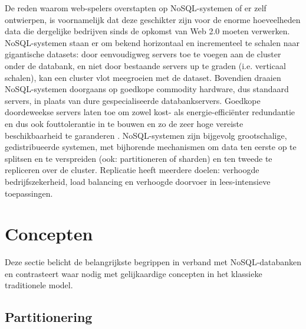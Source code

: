 De reden waarom web-spelers overstapten op NoSQL-systemen of er zelf ontwierpen, is voornamelijk dat deze geschikter zijn voor de enorme hoeveelheden data die dergelijke bedrijven sinds de opkomst van Web 2.0 moeten verwerken. NoSQL-systemen staan er om bekend horizontaal en incrementeel te schalen naar gigantische datasets: door eenvoudigweg servers toe te voegen aan de cluster onder de databank, en niet door bestaande servers up te graden (i.e. verticaal schalen), kan een cluster vlot meegroeien met de dataset. Bovendien draaien NoSQL-systemen doorgaans op goedkope commodity hardware, dus standaard servers, in plaats van dure gespecialiseerde databankservers. Goedkope doordeweekse servers laten toe om zowel kost- als energie-effici\"enter redundantie en dus ook fouttolerantie in te bouwen en zo de zeer hoge vereiste beschikbaarheid te garanderen \cite{barroso2003web}. NoSQL-systemen zijn bijgevolg grootschalige, gedistribueerde systemen, met bijhorende mechanismen om data ten eerste op te splitsen en te verspreiden (ook: partitioneren of sharden) en ten tweede te repliceren over de cluster. Replicatie heeft meerdere doelen: verhoogde bedrijfszekerheid, load balancing en verhoogde doorvoer in lees-intensieve toepassingen.

\section{Concepten}

Deze sectie belicht de belangrijkste begrippen in verband met NoSQL-databanken en contrasteert waar nodig met gelijkaardige concepten in het klassieke traditionele model.

\subsection{Partitionering}

